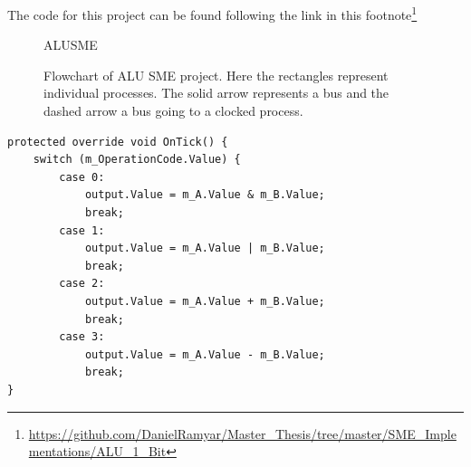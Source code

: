         The code for this project can be found following the link in this footnote\footnote{\url{https://github.com/DanielRamyar/Master_Thesis/tree/master/SME_Implementations/ALU_1_Bit}}  
        
        
        \begin{figure}[h!]
            \centering
            {ALUSME}
            \caption{Flowchart of ALU SME project. Here the rectangles represent individual processes. The solid arrow represents a bus and the dashed arrow a bus going to a clocked process.}
            \label{fig:ALUSME}
        \end{figure}
    
        
        \begin{minipage}{\linewidth}
            \begin{lstlisting}[language={[Sharp]C}, caption={The Ontick() method for the ALU process. Here we use a \texttt{switch} statement, controlled by the \texttt{OperationCode} bus, to determine which operation the ALU should perform. },captionpos=b, label = ALUSME]
protected override void OnTick() {
    switch (m_OperationCode.Value) {
        case 0:
            output.Value = m_A.Value & m_B.Value;
            break;
        case 1:
            output.Value = m_A.Value | m_B.Value;
            break;
        case 2:
            output.Value = m_A.Value + m_B.Value;
            break;
        case 3:
            output.Value = m_A.Value - m_B.Value;
            break;
}
            \end{lstlisting}
      \end{minipage}  
        


    
    
